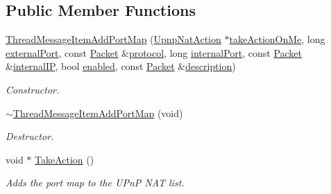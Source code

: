 \subsection*{Public Member Functions}
\begin{DoxyCompactItemize}
\item 
\hyperlink{class_thread_message_item_add_port_map_ab5648afbfc6193413a99c57e874b51f9}{ThreadMessageItemAddPortMap} (\hyperlink{class_upnp_nat_action}{UpnpNatAction} $\ast$\hyperlink{class_thread_message_item_add_port_map_ab99dd390021e1aa79acee63084aa7fe7}{takeActionOnMe}, long \hyperlink{class_thread_message_item_add_port_map_a9a93d83b98c987991cef541605c639f4}{externalPort}, const \hyperlink{class_packet}{Packet} \&\hyperlink{class_thread_message_item_add_port_map_a7dab0698e5517343896ba6960ec04c55}{protocol}, long \hyperlink{class_thread_message_item_add_port_map_ae0c9ba46d365ebcd81301d1df926045e}{internalPort}, const \hyperlink{class_packet}{Packet} \&\hyperlink{class_thread_message_item_add_port_map_adfd5ac5864623818534ae91fc80b7192}{internalIP}, bool \hyperlink{class_thread_message_item_add_port_map_a09fd1018af9c5324812bc962f59eb174}{enabled}, const \hyperlink{class_packet}{Packet} \&\hyperlink{class_thread_message_item_add_port_map_a3e1a5d84d0604a4ef2163dea31755ecb}{description})
\begin{DoxyCompactList}\small\item\em Constructor. \item\end{DoxyCompactList}\item 
\hypertarget{class_thread_message_item_add_port_map_ae474c9a0625f22e8a02b6a8008a8871e}{
\hyperlink{class_thread_message_item_add_port_map_ae474c9a0625f22e8a02b6a8008a8871e}{$\sim$ThreadMessageItemAddPortMap} (void)}
\label{class_thread_message_item_add_port_map_ae474c9a0625f22e8a02b6a8008a8871e}

\begin{DoxyCompactList}\small\item\em Destructor. \item\end{DoxyCompactList}\item 
void $\ast$ \hyperlink{class_thread_message_item_add_port_map_aa1a2e06742183c7fdf839e43fe761a36}{TakeAction} ()
\begin{DoxyCompactList}\small\item\em Adds the port map to the UPnP NAT list. \item\end{DoxyCompactList}\end{DoxyCompactItemize}
